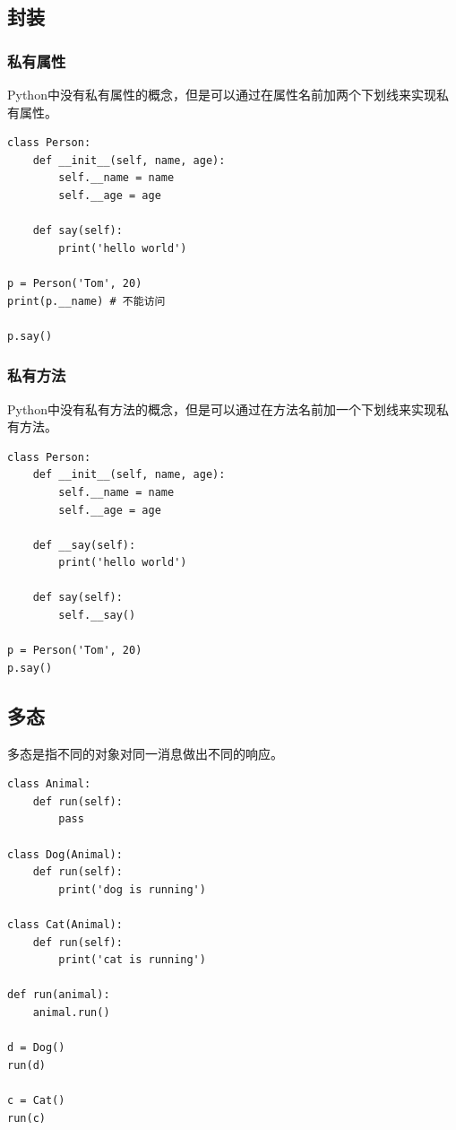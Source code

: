 \subsection{封装}
\subsubsection{私有属性}
Python中没有私有属性的概念，但是可以通过在属性名前加两个下划线来实现私有属性。
\begin{lstlisting}[style=demostyle,numbers=none]
class Person:
    def __init__(self, name, age):
        self.__name = name
        self.__age = age

    def say(self):
        print('hello world')

p = Person('Tom', 20)
print(p.__name) # 不能访问

p.say()
\end{lstlisting}

\subsubsection{私有方法}
Python中没有私有方法的概念，但是可以通过在方法名前加一个下划线来实现私有方法。
\begin{lstlisting}[style=demostyle,numbers=none]
class Person:
    def __init__(self, name, age):
        self.__name = name
        self.__age = age

    def __say(self):
        print('hello world')

    def say(self):
        self.__say()     

p = Person('Tom', 20)
p.say()
\end{lstlisting}

\subsection{多态}
多态是指不同的对象对同一消息做出不同的响应。
\begin{lstlisting}[style=demostyle,numbers=none]
class Animal:
    def run(self):
        pass

class Dog(Animal):
    def run(self):
        print('dog is running')

class Cat(Animal):
    def run(self):
        print('cat is running')

def run(animal):
    animal.run()

d = Dog()
run(d)

c = Cat()
run(c)
\end{lstlisting}




